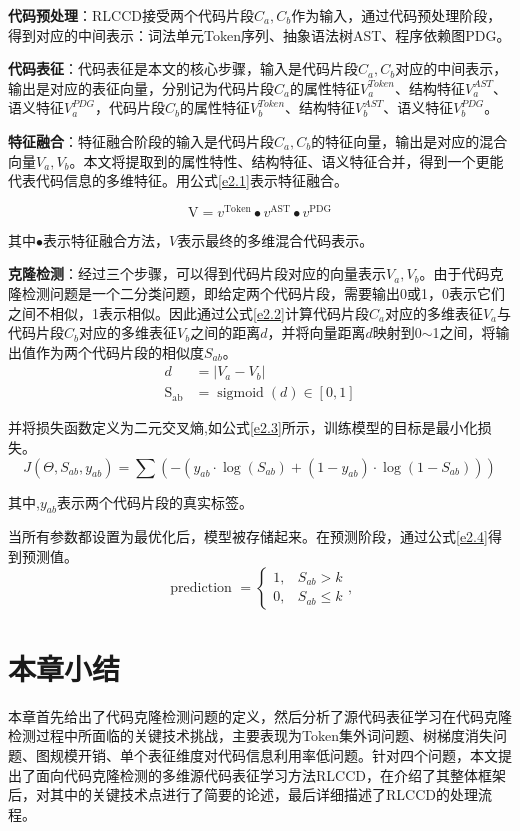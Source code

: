 \textbf{代码预处理}：RLCCD接受两个代码片段$C_{a},C_{b}$作为输入，通过代码预处理阶段，得到对应的中间表示：词法单元Token序列、抽象语法树AST、程序依赖图PDG。

\textbf{代码表征}：代码表征是本文的核心步骤，输入是代码片段$C_{a},C_{b}$对应的中间表示，输出是对应的表征向量，分别记为代码片段$C_{a}$的属性特征$V_{a}^{Token}$、结构特征$V_{a}^{AST}$、语义特征$V_{a}^{PDG}$，代码片段$C_{b}$的属性特征$V_{b}^{Token}$、结构特征$V_{b}^{AST}$、语义特征$V_{b}^{PDG}$。

\textbf{特征融合}：特征融合阶段的输入是代码片段$C_{a},C_{b}$的特征向量，输出是对应的混合向量$V_{a},V_{b}$。本文将提取到的属性特性、结构特征、语义特征合并，得到一个更能代表代码信息的多维特征。用公式\ref{e2.1}表示特征融合。

\begin{equation}\label{e2.1}
    \mathrm{V}= v^{\text{Token}} \bullet v^{\text{AST}} \bullet v^{\text{PDG}}
\end{equation}

其中$\bullet$表示特征融合方法，$V$表示最终的多维混合代码表示。

\textbf{克隆检测}：经过三个步骤，可以得到代码片段对应的向量表示$V_{a},V_{b}$。由于代码克隆检测问题是一个二分类问题，即给定两个代码片段，需要输出0或1，0表示它们之间不相似，1表示相似。因此通过公式\ref{e2.2}计算代码片段$C_{a}$对应的多维表征$V_{a}$与代码片段$C_{b}$对应的多维表征$V_{b}$之间的距离$d$，并将向量距离$d$映射到0$\sim$1之间，将输出值作为两个代码片段的相似度$S_{ab}$。
\begin{equation}\label{e2.2}
    \begin{split}
    d &= \left|V_{a}-V_{b}\right| \\
    \mathrm{S_{ab}} &=\operatorname{sigmoid}\left(d\right) \in[0,1]
    \end{split}
\end{equation}

并将损失函数定义为二元交叉熵,如公式\ref{e2.3}所示，训练模型的目标是最小化损失。
\begin{equation}\label{e2.3}
    J(\Theta, S_{ab}, y_{ab})=\sum(-(y_{ab} \cdot \log (S_{ab})+(1-y_{ab}) \cdot \log (1-S_{ab})))
\end{equation}

其中,$y_{ab}$表示两个代码片段的真实标签。

当所有参数都设置为最优化后，模型被存储起来。在预测阶段，通过公式\ref{e2.4}得到预测值。
\begin{equation}\label{e2.4}
    \text { prediction }=\left\{\begin{array}{ll}
        1, & S_{ab}>k \\
        0, & S_{ab} \leq k
        \end{array},\right.
\end{equation}

\section{本章小结}
\label{sec:Summary2}
本章首先给出了代码克隆检测问题的定义，然后分析了源代码表征学习在代码克隆检测过程中所面临的关键技术挑战，主要表现为Token集外词问题、树梯度消失问题、图规模开销、单个表征维度对代码信息利用率低问题。针对四个问题，本文提出了面向代码克隆检测的多维源代码表征学习方法RLCCD，在介绍了其整体框架后，对其中的关键技术点进行了简要的论述，最后详细描述了RLCCD的处理流程。
